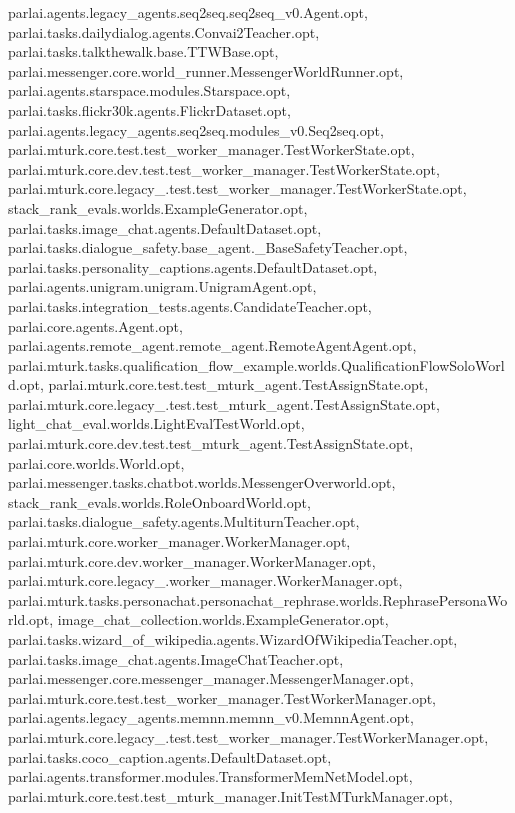 parlai.\+agents.\+legacy\+\_\+agents.\+seq2seq.\+seq2seq\+\_\+v0.\+Agent.\+opt, parlai.\+tasks.\+dailydialog.\+agents.\+Convai2\+Teacher.\+opt, parlai.\+tasks.\+talkthewalk.\+base.\+T\+T\+W\+Base.\+opt, parlai.\+messenger.\+core.\+world\+\_\+runner.\+Messenger\+World\+Runner.\+opt, parlai.\+agents.\+starspace.\+modules.\+Starspace.\+opt, parlai.\+tasks.\+flickr30k.\+agents.\+Flickr\+Dataset.\+opt, parlai.\+agents.\+legacy\+\_\+agents.\+seq2seq.\+modules\+\_\+v0.\+Seq2seq.\+opt, parlai.\+mturk.\+core.\+test.\+test\+\_\+worker\+\_\+manager.\+Test\+Worker\+State.\+opt, parlai.\+mturk.\+core.\+dev.\+test.\+test\+\_\+worker\+\_\+manager.\+Test\+Worker\+State.\+opt, parlai.\+mturk.\+core.\+legacy\+\_.\+test.\+test\+\_\+worker\+\_\+manager.\+Test\+Worker\+State.\+opt, stack\+\_\+rank\+\_\+evals.\+worlds.\+Example\+Generator.\+opt, parlai.\+tasks.\+image\+\_\+chat.\+agents.\+Default\+Dataset.\+opt, parlai.\+tasks.\+dialogue\+\_\+safety.\+base\+\_\+agent.\+\_\+\+Base\+Safety\+Teacher.\+opt, parlai.\+tasks.\+personality\+\_\+captions.\+agents.\+Default\+Dataset.\+opt, parlai.\+agents.\+unigram.\+unigram.\+Unigram\+Agent.\+opt, parlai.\+tasks.\+integration\+\_\+tests.\+agents.\+Candidate\+Teacher.\+opt, parlai.\+core.\+agents.\+Agent.\+opt, parlai.\+agents.\+remote\+\_\+agent.\+remote\+\_\+agent.\+Remote\+Agent\+Agent.\+opt, parlai.\+mturk.\+tasks.\+qualification\+\_\+flow\+\_\+example.\+worlds.\+Qualification\+Flow\+Solo\+World.\+opt, parlai.\+mturk.\+core.\+test.\+test\+\_\+mturk\+\_\+agent.\+Test\+Assign\+State.\+opt, parlai.\+mturk.\+core.\+legacy\+\_.\+test.\+test\+\_\+mturk\+\_\+agent.\+Test\+Assign\+State.\+opt, light\+\_\+chat\+\_\+eval.\+worlds.\+Light\+Eval\+Test\+World.\+opt, parlai.\+mturk.\+core.\+dev.\+test.\+test\+\_\+mturk\+\_\+agent.\+Test\+Assign\+State.\+opt, parlai.\+core.\+worlds.\+World.\+opt, parlai.\+messenger.\+tasks.\+chatbot.\+worlds.\+Messenger\+Overworld.\+opt, stack\+\_\+rank\+\_\+evals.\+worlds.\+Role\+Onboard\+World.\+opt, parlai.\+tasks.\+dialogue\+\_\+safety.\+agents.\+Multiturn\+Teacher.\+opt, parlai.\+mturk.\+core.\+worker\+\_\+manager.\+Worker\+Manager.\+opt, parlai.\+mturk.\+core.\+dev.\+worker\+\_\+manager.\+Worker\+Manager.\+opt, parlai.\+mturk.\+core.\+legacy\+\_.\+worker\+\_\+manager.\+Worker\+Manager.\+opt, parlai.\+mturk.\+tasks.\+personachat.\+personachat\+\_\+rephrase.\+worlds.\+Rephrase\+Persona\+World.\+opt, image\+\_\+chat\+\_\+collection.\+worlds.\+Example\+Generator.\+opt, parlai.\+tasks.\+wizard\+\_\+of\+\_\+wikipedia.\+agents.\+Wizard\+Of\+Wikipedia\+Teacher.\+opt, parlai.\+tasks.\+image\+\_\+chat.\+agents.\+Image\+Chat\+Teacher.\+opt, parlai.\+messenger.\+core.\+messenger\+\_\+manager.\+Messenger\+Manager.\+opt, parlai.\+mturk.\+core.\+test.\+test\+\_\+worker\+\_\+manager.\+Test\+Worker\+Manager.\+opt, parlai.\+agents.\+legacy\+\_\+agents.\+memnn.\+memnn\+\_\+v0.\+Memnn\+Agent.\+opt, parlai.\+mturk.\+core.\+legacy\+\_.\+test.\+test\+\_\+worker\+\_\+manager.\+Test\+Worker\+Manager.\+opt, parlai.\+tasks.\+coco\+\_\+caption.\+agents.\+Default\+Dataset.\+opt, parlai.\+agents.\+transformer.\+modules.\+Transformer\+Mem\+Net\+Model.\+opt, parlai.\+mturk.\+core.\+test.\+test\+\_\+mturk\+\_\+manager.\+Init\+Test\+M\+Turk\+Manager.\+opt, 
